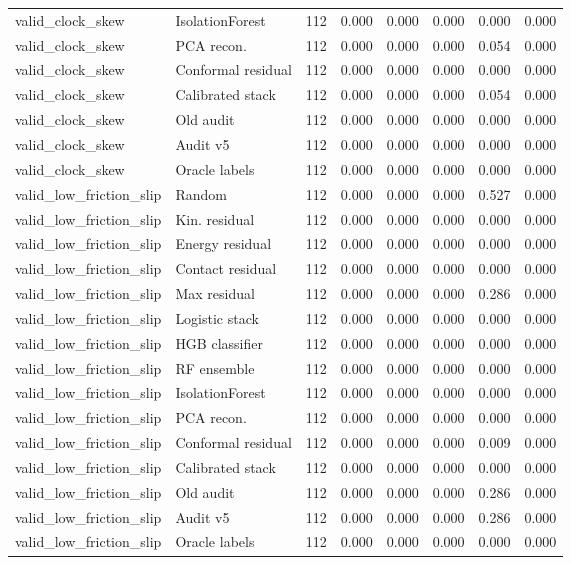 {\begin{longtable}{llrrrrrr}
valid\_clock\_skew & IsolationForest & 112 & 0.000 & 0.000 & 0.000 & 0.000 & 0.000 \\
valid\_clock\_skew & PCA recon. & 112 & 0.000 & 0.000 & 0.000 & 0.054 & 0.000 \\
valid\_clock\_skew & Conformal residual & 112 & 0.000 & 0.000 & 0.000 & 0.000 & 0.000 \\
valid\_clock\_skew & Calibrated stack & 112 & 0.000 & 0.000 & 0.000 & 0.054 & 0.000 \\
valid\_clock\_skew & Old audit & 112 & 0.000 & 0.000 & 0.000 & 0.000 & 0.000 \\
valid\_clock\_skew & Audit v5 & 112 & 0.000 & 0.000 & 0.000 & 0.000 & 0.000 \\
valid\_clock\_skew & Oracle labels & 112 & 0.000 & 0.000 & 0.000 & 0.000 & 0.000 \\
valid\_low\_friction\_slip & Random & 112 & 0.000 & 0.000 & 0.000 & 0.527 & 0.000 \\
valid\_low\_friction\_slip & Kin. residual & 112 & 0.000 & 0.000 & 0.000 & 0.000 & 0.000 \\
valid\_low\_friction\_slip & Energy residual & 112 & 0.000 & 0.000 & 0.000 & 0.000 & 0.000 \\
valid\_low\_friction\_slip & Contact residual & 112 & 0.000 & 0.000 & 0.000 & 0.000 & 0.000 \\
valid\_low\_friction\_slip & Max residual & 112 & 0.000 & 0.000 & 0.000 & 0.286 & 0.000 \\
valid\_low\_friction\_slip & Logistic stack & 112 & 0.000 & 0.000 & 0.000 & 0.000 & 0.000 \\
valid\_low\_friction\_slip & HGB classifier & 112 & 0.000 & 0.000 & 0.000 & 0.000 & 0.000 \\
valid\_low\_friction\_slip & RF ensemble & 112 & 0.000 & 0.000 & 0.000 & 0.000 & 0.000 \\
valid\_low\_friction\_slip & IsolationForest & 112 & 0.000 & 0.000 & 0.000 & 0.000 & 0.000 \\
valid\_low\_friction\_slip & PCA recon. & 112 & 0.000 & 0.000 & 0.000 & 0.000 & 0.000 \\
valid\_low\_friction\_slip & Conformal residual & 112 & 0.000 & 0.000 & 0.000 & 0.009 & 0.000 \\
valid\_low\_friction\_slip & Calibrated stack & 112 & 0.000 & 0.000 & 0.000 & 0.000 & 0.000 \\
valid\_low\_friction\_slip & Old audit & 112 & 0.000 & 0.000 & 0.000 & 0.286 & 0.000 \\
valid\_low\_friction\_slip & Audit v5 & 112 & 0.000 & 0.000 & 0.000 & 0.286 & 0.000 \\
valid\_low\_friction\_slip & Oracle labels & 112 & 0.000 & 0.000 & 0.000 & 0.000 & 0.000 \\
\bottomrule
\end{longtable}
}
